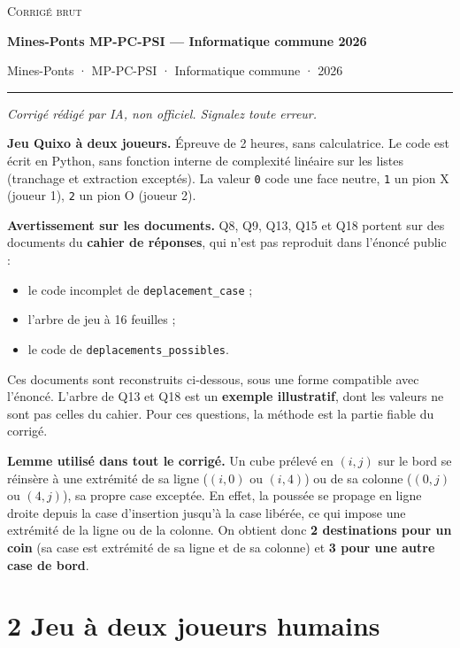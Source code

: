 \documentclass[11pt,a4paper]{article}
\providecommand{\tightlist}{\setlength{\itemsep}{0pt}\setlength{\parskip}{0pt}}
\begin{document}
\thispagestyle{plain}
\begin{center}
  {\small\scshape Corrigé brut}\par\smallskip
  {\LARGE\bfseries Mines-Ponts MP-PC-PSI — Informatique commune 2026\par}\medskip
  {\large Mines-Ponts · MP-PC-PSI · Informatique commune · 2026\par}
\end{center}
\vspace{2pt}\hrule\vspace{8pt}

\emph{Corrigé rédigé par IA, non officiel. Signalez toute erreur.}

\textbf{Jeu Quixo à deux joueurs.} Épreuve de 2 heures, sans calculatrice. Le code est écrit en Python, sans fonction interne de complexité linéaire sur les listes (tranchage et extraction exceptés). La valeur \texttt{0} code une face neutre, \texttt{1} un pion X (joueur 1), \texttt{2} un pion O (joueur 2).

\textbf{Avertissement sur les documents.} Q8, Q9, Q13, Q15 et Q18 portent sur des documents du \textbf{cahier de réponses}, qui n'est pas reproduit dans l'énoncé public :

\begin{itemize}
\tightlist
\item
  le code incomplet de \texttt{deplacement\_case} ;
\item
  l'arbre de jeu à 16 feuilles ;
\item
  le code de \texttt{deplacements\_possibles}.
\end{itemize}

Ces documents sont reconstruits ci-dessous, sous une forme compatible avec l'énoncé. L'arbre de Q13 et Q18 est un \textbf{exemple illustratif}, dont les valeurs ne sont pas celles du cahier. Pour ces questions, la méthode est la partie fiable du corrigé.

\textbf{Lemme utilisé dans tout le corrigé.} Un cube prélevé en \((i,j)\) sur le bord se réinsère à une extrémité de sa ligne (\((i,0)\) ou \((i,4)\)) ou de sa colonne (\((0,j)\) ou \((4,j)\)), sa propre case exceptée. En effet, la poussée se propage en ligne droite depuis la case d'insertion jusqu'à la case libérée, ce qui impose une extrémité de la ligne ou de la colonne. On obtient donc \textbf{2 destinations pour un coin} (sa case est extrémité de sa ligne et de sa colonne) et \textbf{3 pour une autre case de bord}.

\hypertarget{jeu-uxe0-deux-joueurs-humains}{%
\section{2 Jeu à deux joueurs humains}\label{jeu-uxe0-deux-joueurs-humains}}
\end{document}
